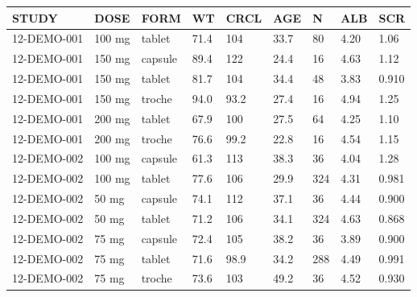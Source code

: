 {\def\arraystretch{1.4}\tabcolsep=5pt
\begin{threeparttable}
\begin{tabular}[h]{lllllllll}
\hline
STUDY & DOSE & FORM & WT & CRCL & AGE & N & ALB & SCR \\
\hline
12-DEMO-001 & 100 mg & tablet & 71.4 & 104 & 33.7 & 80 & 4.20 & 1.06 \\ \hline
12-DEMO-001 & 150 mg & capsule & 89.4 & 122 & 24.4 & 16 & 4.63 & 1.12 \\
12-DEMO-001 & 150 mg & tablet & 81.7 & 104 & 34.4 & 48 & 3.83 & 0.910 \\ \hline
12-DEMO-001 & 150 mg & troche & 94.0 & 93.2 & 27.4 & 16 & 4.94 & 1.25 \\
12-DEMO-001 & 200 mg & tablet & 67.9 & 100 & 27.5 & 64 & 4.25 & 1.10 \\ \hline
12-DEMO-001 & 200 mg & troche & 76.6 & 99.2 & 22.8 & 16 & 4.54 & 1.15 \\
12-DEMO-002 & 100 mg & capsule & 61.3 & 113 & 38.3 & 36 & 4.04 & 1.28 \\
12-DEMO-002 & 100 mg & tablet & 77.6 & 106 & 29.9 & 324 & 4.31 & 0.981 \\
12-DEMO-002 & 50 mg & capsule & 74.1 & 112 & 37.1 & 36 & 4.44 & 0.900 \\
12-DEMO-002 & 50 mg & tablet & 71.2 & 106 & 34.1 & 324 & 4.63 & 0.868 \\
12-DEMO-002 & 75 mg & capsule & 72.4 & 105 & 38.2 & 36 & 3.89 & 0.900 \\
12-DEMO-002 & 75 mg & tablet & 71.6 & 98.9 & 34.2 & 288 & 4.49 & 0.991 \\
12-DEMO-002 & 75 mg & troche & 73.6 & 103 & 49.2 & 36 & 4.52 & 0.930 \\
\hline
\end{tabular}
\end{threeparttable}
}
